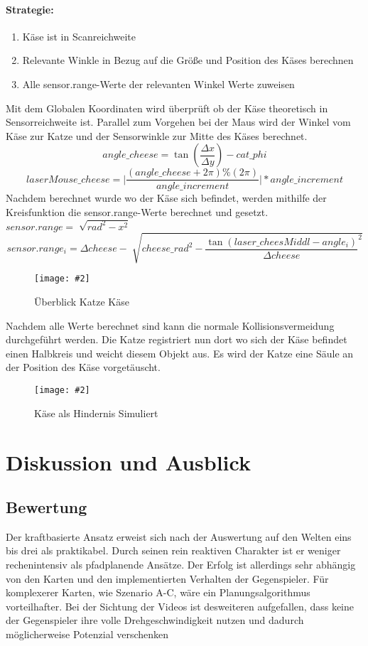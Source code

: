 \documentclass[
a4paper,     %
12pt         %
]{scrartcl}  %
\newcommand{\mygraphics}[3]{
\begin{figure}[!h]
  \begin{center}
    \texttt{[image: \#2]} \\
    \caption{#3}\label{fig:#2}
  \end{center}
\end{figure}

}
\begin{document}
\paragraph{Strategie:}
\begin{enumerate}
\item Käse ist in Scanreichweite
\item Relevante Winkle in Bezug auf die Größe und Position des Käses berechnen
\item Alle sensor.range-Werte der relevanten Winkel Werte zuweisen
\end{enumerate}
Mit dem Globalen Koordinaten wird überprüft ob der Käse theoretisch in Sensorreichweite ist. Parallel zum Vorgehen bei der Maus wird der Winkel vom Käse zur Katze und der Sensorwinkle zur Mitte des Käses berechnet.
\[ angle\_cheese=\tan( \frac{\Delta x}{\Delta y} ) -cat\_phi \]
\[ laserMouse\_cheese  =  \vert \frac{ (angle\_cheese + 2  \pi) \% (2 \pi)}{angle\_increment}  \vert * angle\_increment \]
Nachdem berechnet wurde wo der Käse sich befindet, werden mithilfe der Kreisfunktion die sensor.range-Werte berechnet und gesetzt. $ sensor.range=\sqrt[]{ rad^2 -x^2 }$
\[ sensor.range_i = \Delta cheese - \sqrt[]{ cheese\_rad^2 -\frac{\tan( laser\_cheesMiddl - angle_i) }{\Delta cheese}^2 }\]
\hspace*{0.63\textwidth}
\mygraphics{0.5\textwidth}{catcheese.png}{Überblick Katze Käse}
\noindent Nachdem alle Werte berechnet sind kann die normale Kollisionsvermeidung durchgeführt werden. Die Katze registriert nun dort wo sich der Käse befindet einen Halbkreis und weicht diesem Objekt aus. 
Es wird der Katze eine Säule an der Position des Käse vorgetäuscht.
\mygraphics{0.5\textwidth}{collisionCHEESE.png}{Käse als Hindernis Simuliert}\clearpage
\section{Diskussion und Ausblick}
\subsection{Bewertung}
Der kraftbasierte Ansatz erweist sich nach der Auswertung auf den Welten eins bis drei als praktikabel. Durch seinen rein reaktiven Charakter ist er weniger rechenintensiv als pfadplanende Ansätze. 
Der Erfolg ist allerdings sehr abhängig von den Karten und den implementierten Verhalten der Gegenspieler. Für komplexerer Karten, wie Szenario A-C, wäre ein Planungsalgorithmus vorteilhafter. Bei der Sichtung der Videos ist desweiteren aufgefallen, dass keine der Gegenspieler ihre volle Drehgeschwindigkeit nutzen und dadurch möglicherweise Potenzial verschenken
\end{document}
